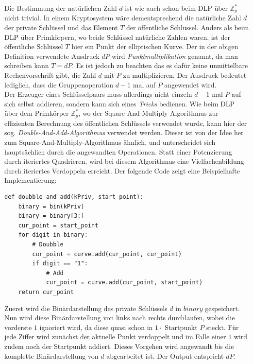 Die Bestimmung der natürlichen Zahl $d$ ist wie auch schon beim DLP über $\mathbb{Z}^*_p$ nicht trivial. In einem Kryptosystem wäre dementsprechend die natürliche Zahl $d$ der private Schlüssel und das Element $T$ der öffentliche Schlüssel. Anders als beim DLP über Primkörpern, wo beide Schlüssel natürliche Zahlen waren, ist der öffentliche Schlüssel $T$ hier ein Punkt der elliptischen Kurve. Der in der obigen Definition verwendete Ausdruck $dP$ wird \textit{Punktmultiplikation} genannt, da man schreiben kann $T = dP$. Es ist jedoch zu beachten das es dafür keine unmittelbare Rechenvorschrift gibt, die Zahl $d$ mit $P$ zu multiplizieren. Der Ausdruck bedeutet lediglich, dass die Gruppenoperation $d-1$ mal auf $P$ angewendet wird.\\

Der Erzeuger eines Schlüsselpaars muss allerdings nicht einzeln $d-1$ mal $P$ auf sich selbst addieren, sondern kann sich eines \textit{Tricks} bedienen. Wie beim DLP über dem Primkörper $\mathbb{Z}^*_p$, wo der Square-And-Multiply-Algorithmus zur effizienten Berechnung des öffentlichen Schlüssels verwendet wurde, kann hier der sog. \textit{Double-And-Add-Algorithmus} verwendet werden. Dieser ist von der Idee her zum Square-And-Multiply-Algorithmus ähnlich, und unterscheidet sich hauptsächlich durch die angewandten Operationen. Statt einer Potenzierung durch iteriertes Quadrieren, wird bei diesem Algorithmus eine Vielfachenbildung durch iteriertes Verdoppeln erreicht. Der folgende Code zeigt eine Beispielhafte Implementierung:

\vspace{\baselineskip}
\begin{lstlisting}[caption={Double-And-Add-Algorithmus in Python}, captionpos=b]
def doubble_and_add(kPriv, start_point):
	binary = bin(kPriv)
	binary = binary[3:]
    cur_point = start_point
    for digit in binary:
        # Doubble
	    cur_point = curve.add(cur_point, cur_point)
		if digit == "1":
	        # Add
            cur_point = curve.add(cur_point, start_point)
    return cur_point
\end{lstlisting}
\vspace{\baselineskip}

Zuerst wird die Binärdarstellung des private Schlüssels $d$ in $binary$ gespeichert. Nun wird diese Binärdarstellung von links nach rechts durchlaufen, wobei die vorderste $1$ ignoriert wird, da diese quasi schon in $1 \cdot$ Startpunkt $P$ steckt. Für jede Ziffer wird zunächst der aktuelle Punkt verdoppelt und im Falle einer $1$ wird zudem noch der Startpunkt addiert. Dieses Vorgehen wird angewandt bis die komplette Binärdarstellung von $d$ abgearbeitet ist. Der Output entspricht $dP$.


